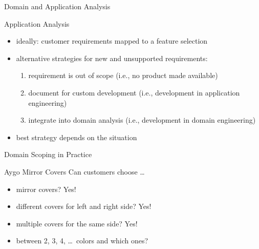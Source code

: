\begin{frame}{Domain and Application Analysis}
\begin{fancycolumns}[T,columns=3,widths={10,49}]
\begin{definition}{Application Analysis}
\begin{itemize}
				\item ideally: customer requirements mapped to a feature selection
				\item alternative strategies for new and unsupported requirements:
					\begin{enumerate}\small %
						\item requirement is out of scope (i.e., no product made available)
						\item document for custom development (i.e., development in application engineering)
						\item integrate into domain analysis (i.e., development in domain engineering)
					\end{enumerate}
				\item best strategy depends on the situation
			\end{itemize}
		\end{definition}
	\end{fancycolumns}
\end{frame}

\begin{frame}{Domain Scoping in Practice}
	\begin{fancycolumns}[widths={70},animation=none]
		\centering{}
	\nextcolumn
		\pause
		\begin{example}{Aygo Mirror Covers}
			Can customers choose \ldots
			\begin{itemize}
				\item<2-> mirror covers? Yes!
				\item<3-> different covers for left and right side? Yes!
				\item<4-> multiple covers for the same side? Yes!
				\item<5-> between 2, 3, 4, \ldots\ colors and which ones?
			\end{itemize}
		\end{example}
	\end{fancycolumns}
\end{frame}

